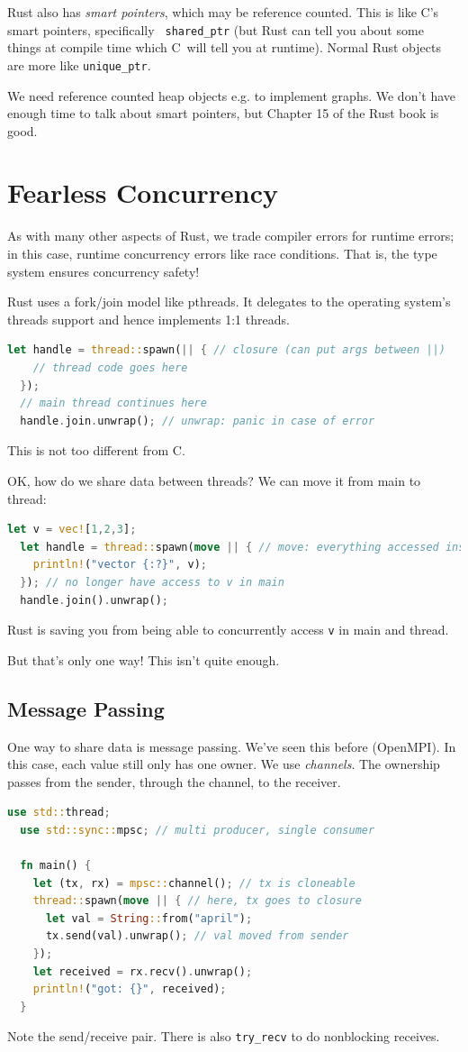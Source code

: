 \documentclass[a4paper]{report}
\newcommand{\CPP}{C\nolinebreak\hspace{-.05em}\raisebox{.4ex}{\tiny\bf +}\nolinebreak\hspace{-.10em}\raisebox{.4ex}{\tiny\bf +}}
\def\CPP{{C\nolinebreak[4]\hspace{-.05em}\raisebox{.4ex}{\tiny\bf ++}}}
\begin{document}
Rust also has \emph{smart pointers}, which may be reference
counted. This is like \CPP's smart pointers, specifically {\tt
  shared\_ptr} (but Rust can tell you about some things at compile
time which \CPP~will tell you at runtime). Normal Rust objects are more
like {\tt unique\_ptr}.

We need reference counted heap objects e.g. to implement graphs. We don't have
enough time to talk about smart pointers, but Chapter 15 of the Rust book is good.

\section*{Fearless Concurrency}
As with many other aspects of Rust, we trade compiler errors for runtime
errors; in this case, runtime concurrency errors like race conditions.
That is, the type system ensures concurrency safety!

Rust uses a fork/join model like pthreads. It delegates to the operating
system's threads support and hence implements 1:1 threads.
\begin{lstlisting}[language=Rust]
  let handle = thread::spawn(|| { // closure (can put args between ||)
    // thread code goes here
  });
  // main thread continues here
  handle.join.unwrap(); // unwrap: panic in case of error
\end{lstlisting}
This is not too different from \CPP.

OK, how do we share data between threads? We can move it from main to thread:
\begin{lstlisting}[language=Rust]
  let v = vec![1,2,3];
  let handle = thread::spawn(move || { // move: everything accessed inside closure is moved
    println!("vector {:?}", v);
  }); // no longer have access to v in main
  handle.join().unwrap();
\end{lstlisting}
Rust is saving you from being able to concurrently access {\tt v} in main and thread.

But that's only one way! This isn't quite enough.

\subsection*{Message Passing}
One way to share data is message passing. We've seen this before (OpenMPI).
In this case, each value still only has one owner. We use \emph{channels}. The ownership passes
from the sender, through the channel, to the receiver.
\begin{lstlisting}[language=Rust]
  use std::thread;
  use std::sync::mpsc; // multi producer, single consumer

  fn main() {
    let (tx, rx) = mpsc::channel(); // tx is cloneable
    thread::spawn(move || { // here, tx goes to closure
      let val = String::from("april");
      tx.send(val).unwrap(); // val moved from sender
    });
    let received = rx.recv().unwrap();
    println!("got: {}", received);
  }
\end{lstlisting}
Note the send/receive pair. There is also {\tt try\_recv} to do nonblocking receives.
\end{document}

